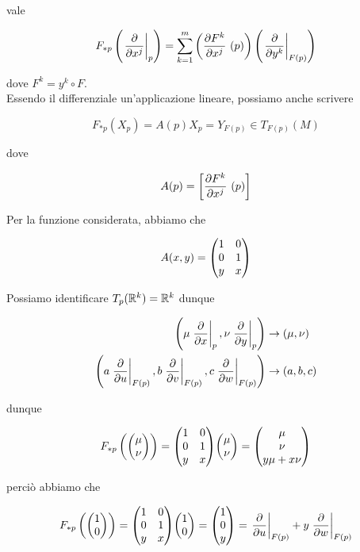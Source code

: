 vale

\begin{equation}
	F_{*p} \left( \eval{\pdv{x^{j}}}_{p} \right) = \sum_{k=1}^{m} \left( \pdv{F^{k}}{x^{j}}\ (p) \right) \left( \eval{\pdv{y^{k}}}_{F(p)} \right)
\end{equation}

dove $ F^{k} = y^{k} \circ F $.\\
Essendo  il differenziale un'applicazione lineare, possiamo anche scrivere

\begin{equation}
	F_{*p} (X_{p}) = A(p) X_{p} = Y_{F(p)} \in T_{F(p)}(M)
\end{equation}

dove

\begin{equation}
	A(p) = \left[ \pdv{F^{k}}{x^{j}}\ (p) \right]
\end{equation}

Per la funzione considerata, abbiamo che

\begin{equation}
	A(x,y) = \mqty( 1 & 0 \\ 0 & 1 \\ y & x )
\end{equation}

Possiamo identificare $ T_{p}(\mathbb{R}^{k}) = \mathbb{R}^{k} $ dunque

\begin{align}
	\begin{split}
		\left( \mu \eval{\pdv{x}}_{p}, \nu \eval{\pdv{y}}_{p} \right) &\to (\mu,\nu)\\
		\left( a \eval{\pdv{u}}_{F(p)}, b \eval{\pdv{v}}_{F(p)}, c \eval{\pdv{w}}_{F(p)} \right) &\to (a,b,c)
	\end{split}
\end{align}

dunque

\begin{equation}
	F_{*p} \left( \mqty( \mu \\ \nu ) \right) = \mqty( 1 & 0 \\ 0 & 1 \\ y & x ) \mqty( \mu \\ \nu ) = \mqty( \mu \\ \nu \\ y \mu + x \nu )
\end{equation}

perciò abbiamo che

\begin{equation}
	F_{*p} \left( \mqty( 1 \\ 0 ) \right) = \mqty( 1 & 0 \\ 0 & 1 \\ y & x ) \mqty( 1 \\ 0 ) = \mqty( 1 \\ 0 \\ y ) = \eval{\pdv{u}}_{F(p)} + y \eval{\pdv{w}}_{F(p)}
\end{equation}

